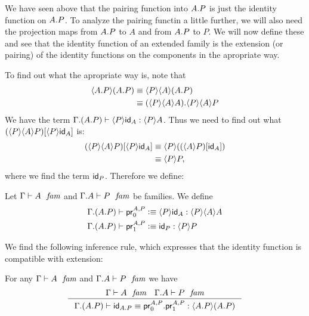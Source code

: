 We have seen above that the pairing function into $\ctxext{A}{P}$ is just the identity function on
$\ctxext{A}{P}$. To analyze the pairing functin a little further, we will also
need the projection maps from $\ctxext{A}{P}$ to $A$ and from $\ctxext{A}{P}$
to $P$. We will now define these and see that the identity function of an
extended family is the extension (or pairing) of the identity
functions on the components in the apropriate way.

To find out what the
apropriate way is, note that
\begin{align*}
\ctxwk{\ctxext{A}{P}}{\ctxext{A}{P}} & \jdeq \ctxwk{P}{{A}{\ctxext{A}{P}}}\\
& \jdeq \ctxext{\ctxwk{P}{{A}{A}}}{\ctxwk{P}{{A}{P}}}
\end{align*}
We have the term $\jterm{{\Gamma}{{A}{P}}}{\ctxwk{P}{A}}{\ctxwk{P}{\idfunc[A]}}$.
Thus we need to find out what $\subst{\ctxwk{P}{\idfunc[A]}}{\ctxwk{P}{{A}{P}}}$ is:
\begin{align*}
\subst{\ctxwk{P}{\idfunc[A]}}{\ctxwk{P}{{A}{P}}} & \jdeq \ctxwk{P}{\subst{\idfunc[A]}{\ctxwk{A}{P}}}\\
& \jdeq \ctxwk{P}{P},
\end{align*}
where we find the term $\idfunc[P]$. Therefore we define:

\begin{defn}
Let $\jfam{\Gamma}{A}$ and $\jfam{{\Gamma}{A}}{P}$ be families. We define
\begin{align*}
\jtermdefn*{\ctxext{\Gamma}{{A}{P}}}{\ctxwk{P}{{A}{A}}}{\cprojfstf{A}{P}}{\ctxwk{P}{\idfunc[A]}}\\
\jtermdefn*{\ctxext{\Gamma}{{A}{P}}}{\ctxwk{P}{P}}{\cprojsndf{A}{P}}{\idfunc[P]}
\end{align*}
\end{defn}

We find the following inference rule, which expresses that the identity function
is compatible with extension:

\begin{lem}
For any $\jfam{\Gamma}{A}$ and $\jfam{{\Gamma}{A}}{P}$ we have
\begin{equation}\label{idfunc-ext-comp}
\inference
  {\jfam{\Gamma}{A}
   \jfam{{\Gamma}{A}}{P}}
  {\jtermeq
    {{\Gamma}{{A}{P}}}
    {\ctxwk{\ctxext{A}{P}}{\ctxext{A}{P}}}
    {\idfunc[\ctxext{A}{P}]}
    {\ctxext{\cprojfstf{A}{P}}{\cprojsndf{A}{P}}}}
\end{equation}
\end{lem}

